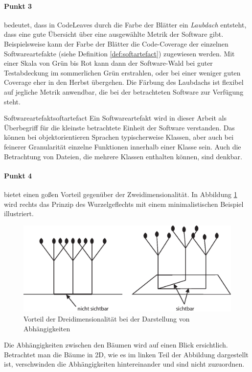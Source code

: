 \paragraph{Punkt 3} bedeutet, dass in CodeLeaves durch die Farbe der Blätter ein \emph{Laubdach} entsteht, dass eine gute Übersicht über eine ausgewählte Metrik der Software gibt. Beispielsweise kann der Farbe der Blätter die Code-Coverage der einzelnen Softwareartefakte (siehe Definition \ref{def:softartefact}) zugewiesen werden. Mit einer Skala von Grün bis Rot kann dann der Software-Wald bei guter Testabdeckung im sommerlichen Grün erstrahlen, oder bei einer weniger guten Coverage eher in den Herbst übergehen. Die Färbung des Laubdachs ist flexibel auf jegliche Metrik anwendbar, die bei der betrachteten Software zur Verfügung steht.

\begin{defbox}{Softwareartefakt}{softartefact}
  Ein Softwareartefakt wird in dieser Arbeit als Überbegriff für die kleinste betrachtete Einheit der Software verstanden. Das können bei objektorientieren Sprachen typischerweise Klassen, aber auch bei feinerer Granularität einzelne Funktionen innerhalb einer Klasse sein. Auch die Betrachtung von Dateien, die mehrere Klassen enthalten können, sind denkbar.
\end{defbox}

\paragraph{Punkt 4} bietet einen goßen Vorteil gegenüber der Zweidimensionalität. In Abbildung \ref{fig:3d-advantage} wird rechts das Prinzip des Wurzelgeflechts mit einem minimalistischen Beispiel illustriert.

\begin{figure}[htb]
  \includegraphics[width=.8\textwidth]{figures/3d-advantage}
  \caption{Vorteil der Dreidimensionalität bei der Darstellung von Abhängigkeiten}
  \label{fig:3d-advantage}
\end{figure}

Die Abhängigkeiten zwischen den Bäumen wird auf einen Blick ersichtlich. Betrachtet man die Bäume in 2D, wie es im linken Teil der Abbildung dargestellt ist, verschwinden die Abhängigkeiten hintereinander und sind nicht zuzuordnen.

